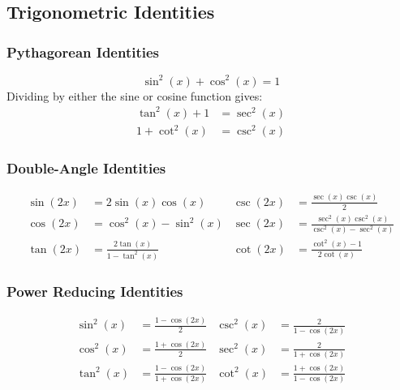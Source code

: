 \documentclass{article}
\begin{document}
\subsection{Trigonometric Identities}
\subsubsection{Pythagorean Identities}
\begin{equation*}
    \sin^2{\left( x \right)} + \cos^2{\left( x \right)} = 1
\end{equation*}
Dividing by either the sine or cosine function gives:
\begin{align*}
    \tan^2{\left( x \right)} + 1 & = \sec^2{\left( x \right)} \\
    1 + \cot^2{\left( x \right)} & = \csc^2{\left( x \right)}
\end{align*}
\subsubsection{Double-Angle Identities}
\begin{align*}
    \sin{\left( 2x \right)} & = 2\sin{\left( x \right)}\cos{\left( x \right)}              & \csc{\left( 2x \right)} & = \frac{\sec{\left( x \right)}\csc{\left( x \right)}}{2}                                                     \\[5pt]
    \cos{\left( 2x \right)} & = \cos^2{\left( x \right)} - \sin^2{\left( x \right)}        & \sec{\left( 2x \right)} & = \frac{\sec^2{\left( x \right)}\csc^2{\left( x \right)}}{\csc^2{\left( x \right)}-\sec^2{\left( x \right)}} \\[5pt]
    \tan{\left( 2x \right)} & = \frac{2\tan{\left( x \right)}}{1-\tan^2{\left( x \right)}} & \cot{\left( 2x \right)} & = \frac{\cot^2{\left( x \right)}-1}{2\cot{\left( x \right)}}
\end{align*}
\subsubsection{Power Reducing Identities}
\begin{align*}
    \sin^2{\left( x \right)} & = \frac{1-\cos{\left( 2x \right)}}{2}                         & \csc^2{\left( x \right)} & = \frac{2}{1-\cos{\left( 2x \right)}}                         \\[5pt]
    \cos^2{\left( x \right)} & = \frac{1+\cos{\left( 2x \right)}}{2}                         & \sec^2{\left( x \right)} & = \frac{2}{1+\cos{\left( 2x \right)}}                         \\[5pt]
    \tan^2{\left( x \right)} & = \frac{1-\cos{\left( 2x \right)}}{1+\cos{\left( 2x \right)}} & \cot^2{\left( x \right)} & = \frac{1+\cos{\left( 2x \right)}}{1-\cos{\left( 2x \right)}}
\end{align*}
\end{document}
